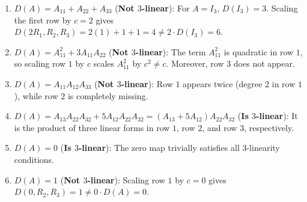 \begin{exercisesolution*}
\label{sol:multilinear_candidates_3x3}
\begin{enumerate}[label=\textbf{(\alph*)}]
    \item $D(A) = A_{11} + A_{22} + A_{33}$ (\textbf{Not $3$-linear}):
    For $A = I_3$, $D(I_3) = 3$. Scaling the first row by $c = 2$ gives $D(2R_1, R_2, R_3) = 2(1) + 1 + 1 = 4 \ne 2 \cdot D(I_3) = 6$.

    \item $D(A) = A_{11}^2 + 3A_{11} A_{22}$ (\textbf{Not $3$-linear}):
    The term $A_{11}^2$ is quadratic in row $1$, so scaling row $1$ by $c$ scales $A_{11}^2$ by $c^2 \ne c$. Moreover, row $3$ does not appear.

    \item $D(A) = A_{11} A_{12} A_{33}$ (\textbf{Not $3$-linear}):
    Row $1$ appears twice (degree $2$ in row $1$), while row $2$ is completely missing.

    \item $D(A) = A_{13} A_{22} A_{32} + 5A_{12} A_{22} A_{32} = (A_{13} + 5A_{12}) A_{22} A_{32}$ (\textbf{Is $3$-linear}):
    It is the product of three linear forms in row $1$, row $2$, and row $3$, respectively.

    \item $D(A) = 0$ (\textbf{Is $3$-linear}):
    The zero map trivially satisfies all $3$-linearity conditions.

    \item $D(A) = 1$ (\textbf{Not $3$-linear}):
    Scaling row $1$ by $c = 0$ gives $D(0, R_2, R_3) = 1 \ne 0 \cdot D(A) = 0$. \qedhere
\end{enumerate}
\end{exercisesolution*}

